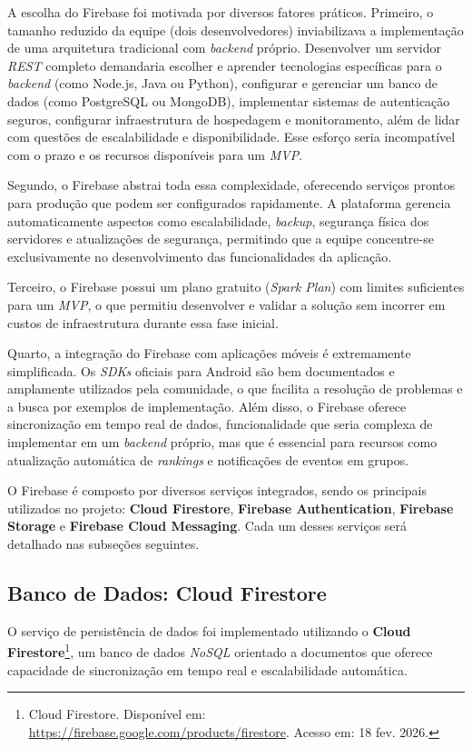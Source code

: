 A escolha do Firebase foi motivada por diversos fatores práticos. Primeiro, o tamanho reduzido da equipe (dois desenvolvedores) inviabilizava a implementação de uma arquitetura tradicional com \textit{backend} próprio. Desenvolver um servidor \textit{REST} completo demandaria escolher e aprender tecnologias específicas para o \textit{backend} (como Node.js, Java ou Python), configurar e gerenciar um banco de dados (como PostgreSQL ou MongoDB), implementar sistemas de autenticação seguros, configurar infraestrutura de hospedagem e monitoramento, além de lidar com questões de escalabilidade e disponibilidade. Esse esforço seria incompatível com o prazo e os recursos disponíveis para um \textit{MVP}.

Segundo, o Firebase abstrai toda essa complexidade, oferecendo serviços prontos para produção que podem ser configurados rapidamente. A plataforma gerencia automaticamente aspectos como escalabilidade, \textit{backup}, segurança física dos servidores e atualizações de segurança, permitindo que a equipe concentre-se exclusivamente no desenvolvimento das funcionalidades da aplicação.

Terceiro, o Firebase possui um plano gratuito (\textit{Spark Plan}) com limites suficientes para um \textit{MVP}, o que permitiu desenvolver e validar a solução sem incorrer em custos de infraestrutura durante essa fase inicial.

Quarto, a integração do Firebase com aplicações móveis é extremamente simplificada. Os \textit{SDKs} oficiais para Android são bem documentados e amplamente utilizados pela comunidade, o que facilita a resolução de problemas e a busca por exemplos de implementação. Além disso, o Firebase oferece sincronização em tempo real de dados, funcionalidade que seria complexa de implementar em um \textit{backend} próprio, mas que é essencial para recursos como atualização automática de \textit{rankings} e notificações de eventos em grupos.

O Firebase é composto por diversos serviços integrados, sendo os principais utilizados no projeto: \textbf{Cloud Firestore}, \textbf{Firebase Authentication}, \textbf{Firebase Storage} e \textbf{Firebase Cloud Messaging}. Cada um desses serviços será detalhado nas subseções seguintes.

\subsection{Banco de Dados: Cloud Firestore}

O serviço de persistência de dados foi implementado utilizando o \textbf{Cloud Firestore}\footnote{Cloud Firestore. Disponível em: \url{https://firebase.google.com/products/firestore}. Acesso em: 18 fev. 2026.}, um banco de dados \textit{NoSQL} orientado a documentos que oferece capacidade de sincronização em tempo real e escalabilidade automática.

